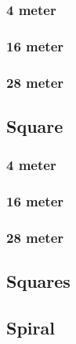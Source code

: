 \subsubsection{4 meter}
\begin{figure}[H]
    \centering
    
\end{figure}
\subsubsection{16 meter}
\begin{figure}[H]
    \centering
    
\end{figure}
\subsubsection{28 meter}
\begin{figure}[H]
    \centering
    
\end{figure}
\subsection{Square}
\subsubsection{4 meter}
\begin{figure}[H]
    \centering
    
\end{figure}
\subsubsection{16 meter}
\begin{figure}[H]
    \centering
    
\end{figure}
\subsubsection{28 meter}
\begin{figure}[H]
    \centering
    
\end{figure}
\subsection{Squares}
\subsection{Spiral}